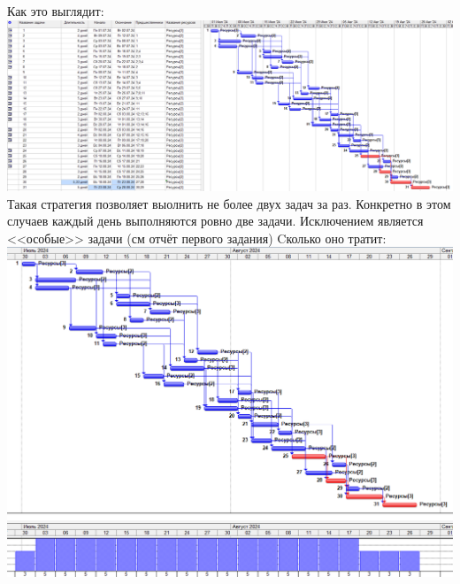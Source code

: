 \documentclass[14pt]{article}
\begin{document}
		{\LARGE Как это выглядит:}\\
		\includegraphics[width=\textwidth]{../img/ot2b1_1.png}\\
		Такая стратегия позволяет выолнить не более двух задач за раз.
		Конкретно в этом случаев каждый день выполняются ровно две задачи.
		Исключением является <<особые>> задачи (см отчёт первого задания)
		{\LARGE Cколько оно тратит:}\\
		\includegraphics[width=\textwidth]{../img/2b1_answer.png}\\ 
\end{document}
